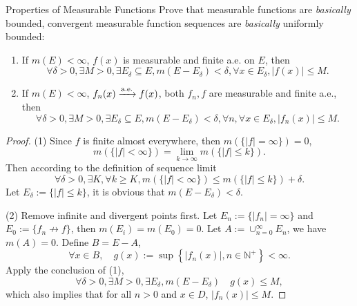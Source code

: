 \begin{example}{Properties of Measurable Functions}{}
  Prove that measurable functions are \emph{basically} bounded,
  convergent measurable function sequences are \emph{basically} uniformly bounded:
  \begin{enumerate}
  \item If $m(E) < \infty$, $f(x)$ is measurable and finite a.e. on $E$, then
    \begin{equation}
      \forall \delta > 0, \exists M > 0, \exists E_{\delta} \subseteq E, m(E - E_{\delta}) < \delta,
      \forall x \in E_{\delta}, |f(x)| \leq M.
    \end{equation}
  \item If $m(E) < \infty$, $f_n(x) \xrightarrow{\text{a.e.}} f(x)$, both $f_n, f$ are measurable
    and finite a.e., then
    \begin{equation}
      \forall \delta > 0, \exists M > 0, \exists E_{\delta} \subseteq E, m(E - E_{\delta}) < \delta,
      \forall n, \forall x \in E_{\delta}, |f_n(x)| \leq M.
    \end{equation}
  \end{enumerate}
\end{example}

\begin{proof}
  (1) Since $f$ is finite almost everywhere, then $m(\{|f| = \infty\}) = 0$,
  \begin{equation}
    m(\{|f| < \infty\})
    = \lim \limits _{k \rightarrow \infty} m(\{|f| \leq k\}).
  \end{equation}
  Then according to the definition of sequence limit
  \begin{equation}
    \forall \delta > 0, \exists K, \forall k \geq K,
    m(\{|f| < \infty\}) \leq m(\{|f| \leq k\}) + \delta.
  \end{equation}
  Let $E_{\delta} := \{|f| \leq k\}$, it is obvious that $m(E - E_{\delta}) < \delta$.

  (2) Remove infinite and divergent points first.
  Let $E_n := \{|f_n| = \infty\}$ and $E_0 := \{f_n \not \rightarrow f\}$,
  then $m(E_i) = m(E_0) = 0$.
  Let $A := \cup _{n = 0}^{\infty} E_n$, we have $m(A) = 0$.
  Define $B = E - A$,
  \begin{equation}
    \forall x \in B, \quad g(x) := \sup \left\{ |f_n(x)| , n \in \mathbb{N}^+\right\} < \infty.
  \end{equation}
  Apply the conclusion of (1),
  \begin{equation}
    \forall \delta > 0, \exists M > 0, \exists E_{\delta}, m(E - E_{\delta})
    \quad g(x) \leq M,
  \end{equation}
  which also implies that for all $n > 0$ and $x \in D$, $|f_n(x)| \leq M$.
\end{proof}

